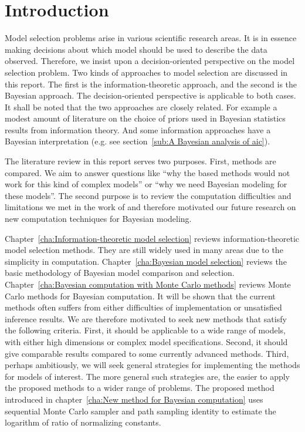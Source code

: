 \chapter{Introduction}
\label{cha:Introduction}

Model selection problems arise in various scientific research areas. It is in
essence making decisions about which model should be used to describe the data
observed. Therefore, we insist upon a decision-oriented perspective on the
model selection problem. Two kinds of approaches to model selection are
discussed in this report. The first is the information-theoretic approach, and
the second is the Bayesian approach. The decision-oriented perspective is
applicable to both cases. It shall be noted that the two approaches are
closely related. For example a modest amount of literature on the choice of
priors used in Bayesian statistics results from information theory. And some
information approaches have a Bayesian interpretation (e.g. see
section~\ref{sub:A Bayesian analysis of aic}).

The literature review in this report serves two purposes. First, methods are
compared. We aim to answer questions like ``why the \aic based methods would
not work for this kind of complex models'' or ``why we need Bayesian modeling
for these models''. The second purpose is to review the computation
difficulties and limitations we met in the work of \textcite{Zhou2011} and
therefore motivated our future research on new computation techniques for
Bayesian modeling.

Chapter~\ref{cha:Information-theoretic model selection} reviews
information-theoretic model selection methods. They are still widely used in
many areas due to the simplicity in computation. Chapter~\ref{cha:Bayesian
  model selection} reviews the basic methodology of Bayesian model comparison
and selection. Chapter~\ref{cha:Bayesian computation with Monte Carlo methods}
reviews Monte Carlo methods for Bayesian computation. It will be shown that
the current methods often suffers from either difficulties of implementation
or unsatisfied inference results. We are therefore motivated to seek new
methods that satisfy the following criteria. First, it should be applicable to
a wide range of models, with either high dimensions or complex model
specifications. Second, it should give comparable results compared to some
currently advanced methods. Third, perhaps ambitiously, we will seek general
strategies for implementing the methods for models of interest. The more
general such strategies are, the easier to apply the proposed methods to a
wider range of problems. The proposed method introduced in
chapter~\ref{cha:New method for Bayesian computation} uses sequential Monte
Carlo sampler and path sampling identity to estimate the logarithm of ratio of
normalizing constants.

